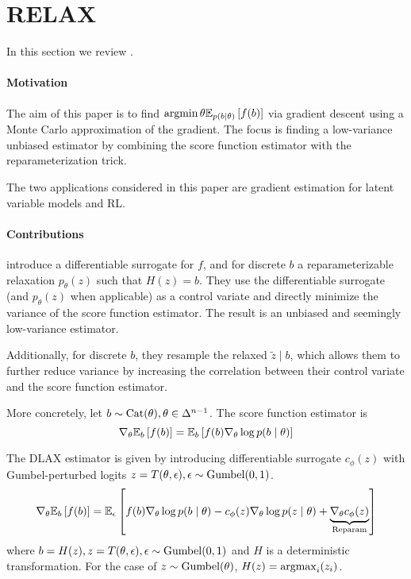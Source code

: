 \section{RELAX}
In this section we review \citet{grathwohl2017relax}.

\paragraph{Motivation}
The aim of this paper is to find $\operatorname*{argmin}\theta \mathbb{E}_{p(b \mid \theta)}\left[f(b)\right]$
via gradient descent using a Monte Carlo approximation of the gradient.
The focus is finding a low-variance unbiased estimator by combining
the score function estimator with the reparameterization trick.

The two applications considered in this paper are gradient
estimation for latent variable models and RL.

\paragraph{Contributions}
\citet{grathwohl2017relax} introduce a differentiable surrogate for $f$, and for discrete $b$
a reparameterizable relaxation $p_\theta(z)$ such that $H(z) = b$.
They use the differentiable surrogate (and $p_\theta(z)$ when applicable) as a control
variate and directly minimize the variance of the score function estimator.
The result is an unbiased and seemingly low-variance estimator.

Additionally, for discrete $b$,
they resample the relaxed $\tilde{z} \mid b$,
which allows them to further reduce variance by increasing the correlation between
their control variate and the score function estimator.

More concretely, let $b \sim \mathrm{Cat}(\theta), \theta \in \Delta^{n-1}$.
The score function estimator is
\begin{equation}
\nabla_\theta \mathbb{E}_{b}\left[f(b)\right] = \mathbb{E}_{b}\left[f(b)\nabla_\theta \log p(b\mid\theta)\right]
\end{equation}

The DLAX estimator is given by introducing differentiable surrogate $c_\phi(z)$
with Gumbel-perturbed logits $z = T(\theta, \epsilon), \epsilon\sim\mathrm{Gumbel}(0,1)$.
\begin{equation}
\nabla_\theta \mathbb{E}_{b}\left[f(b)\right] = \mathbb{E}_{\epsilon}\left[f(b)\nabla_\theta \log p(b\mid\theta)
- c_\phi(z)\nabla_\theta \log p(z \mid \theta)
+ \underbrace{\nabla_\theta c_\phi(z)}_\textrm{Reparam}\right]
\end{equation}
where $b = H(z), z=T(\theta,\epsilon),\epsilon\sim \mathrm{Gumbel}(0,1)$ and $H$ is a deterministic transformation.
For the case of $z\sim\mathrm{Gumbel}(\theta)$, $H(z) = \operatorname*{argmax}_i(z_i)$.

